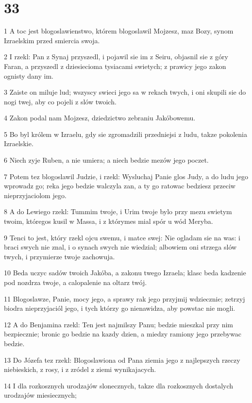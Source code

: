\chapter{33}

\par 1 A toc jest blogoslawienstwo, którem blogoslawil Mojzesz, maz Bozy, synom Izraelskim przed smiercia swoja.
\par 2 I rzekl: Pan z Synaj przyszedl, i pojawil sie im z Seiru, objasnil sie z góry Faran, a przyszedl z dziesiecioma tysiacami swietych; z prawicy jego zakon ognisty dany im.
\par 3 Zaiste on miluje lud; wszyscy swieci jego sa w rekach twych, i oni skupili sie do nogi twej, aby co pojeli z slów twoich.
\par 4 Zakon podal nam Mojzesz, dziedzictwo zebraniu Jakóbowemu.
\par 5 Bo byl królem w Izraelu, gdy sie zgromadzili przedniejsi z ludu, takze pokolenia Izraelskie.
\par 6 Niech zyje Ruben, a nie umiera; a niech bedzie mezów jego poczet.
\par 7 Potem tez blogoslawil Judzie, i rzekl: Wysluchaj Panie glos Judy, a do ludu jego wprowadz go; reka jego bedzie walczyla zan, a ty go ratowac bedziesz przeciw nieprzyjaciolom jego.
\par 8 A do Lewiego rzekl: Tummim twoje, i Urim twoje bylo przy mezu swietym twoim, któregos kusil w Massa, i z którymes mial spór u wód Meryba.
\par 9 Tenci to jest, który rzekl ojcu swemu, i matce swej: Nie ogladam sie na was: i braci swych nie znal, i o synach swych nie wiedzial; albowiem oni strzega slów twych, i przymierze twoje zachowuja.
\par 10 Beda uczyc sadów twoich Jakóba, a zakonu twego Izraela; klasc beda kadzenie pod nozdrza twoje, a calopalenie na oltarz twój.
\par 11 Blogoslawze, Panie, mocy jego, a sprawy rak jego przyjmij wdziecznie; zetrzyj biodra nieprzyjaciól jego, i tych którzy go nienawidza, aby powstac nie mogli.
\par 12 A do Benjamina rzekl: Ten jest najmilszy Panu; bedzie mieszkal przy nim bezpiecznie; bronic go bedzie na kazdy dzien, a miedzy ramiony jego przebywac bedzie.
\par 13 Do Józefa tez rzekl: Blogoslawiona od Pana ziemia jego z najlepszych rzeczy niebieskich, z rosy, i z zródel z ziemi wynikajacych.
\par 14 I dla rozkosznych urodzajów slonecznych, takze dla rozkosznych dostalych urodzajów miesiecznych;
